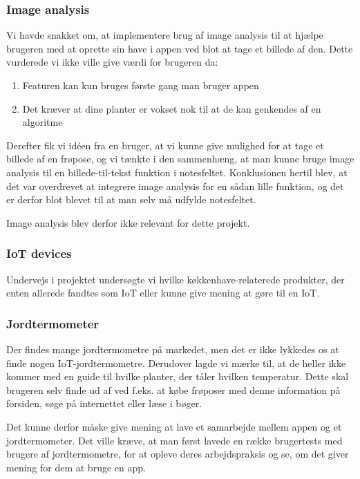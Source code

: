 \subsubsection{Image analysis}
Vi havde snakket om, at implementere brug af image analysis til at hjælpe brugeren med at oprette sin have i appen ved blot at tage et billede af den. Dette vurderede vi ikke ville give værdi for brugeren da:
\begin{enumerate}
        \item Featuren kan kun bruges første gang man bruger appen
        \item Det kræver at dine planter er vokset nok til at de kan genkendes af en algoritme
\end{enumerate}

Derefter fik vi idéen fra en bruger, at vi kunne give mulighed for at tage et billede af en frøpose, og vi tænkte i den sammenhæng, at man kunne bruge image analysis til en billede-til-tekst funktion i notesfeltet. Konklusionen hertil blev, at det var overdrevet at integrere image analysis for en sådan lille funktion, og det er derfor blot blevet til at man selv må udfylde notesfeltet. 

Image analysis blev derfor ikke relevant for dette projekt.

\subsubsection{IoT devices}
Undervejs i projektet undersøgte vi hvilke køkkenhave-relaterede produkter, der enten allerede fandtes som IoT eller kunne give mening at gøre til en IoT.

\subsubsection*{Jordtermometer}
Der findes mange jordtermometre på markedet, men det er ikke lykkedes os at finde nogen IoT-jordtermometre. Derudover lagde vi mærke til, at de heller ikke kommer med en guide til hvilke planter, der tåler hvilken temperatur. Dette skal brugeren selv finde ud af ved f.eks. at købe frøposer med denne information på forsiden, søge på internettet eller læse i bøger. 

Det kunne derfor måske give mening at lave et samarbejde mellem appen og et jordtermometer. Det ville kræve, at man først lavede en række brugertests med brugere af jordtermometre, for at opleve deres arbejdspraksis og se, om det giver mening for dem at bruge en app.

